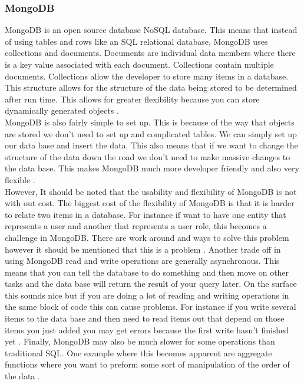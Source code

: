 \documentclass[onecolumn, draftclsnofoot,10pt, compsoc]{article}
\begin{document}
		\subsubsection{MongoDB}
		MongoDB is an open source database NoSQL database. This means that instead of using tables and rows like an SQL relational database, MongoDB uses collections and documents. Documents are individual data members where there is a key value associated with each document. Collections contain multiple documents. Collections allow the developer to store many items in a database. This structure allows for the structure of the data being stored to be determined after run time. This allows for greater flexibility because you can store dynamically generated objects \cite{IEEEexample:MongoDB}.\\
		MongoDB is also fairly simple to set up. This is because of the way that objects are stored we don't need to set up and complicated tables. We can simply set up our data base and insert the data. This also means that if we want to change the structure of the data down the road we don't need to make massive changes to the data base. This makes MongoDB much more developer friendly and also very flexible \cite{IEEEexample:MongoDBvsSQL}.\\
		However, It should be noted that the usability and flexibility of MongoDB is not with out cost. The biggest cost of the flexibility of MongoDB is that it is harder to relate two items in a database. For instance if want to have one entity that represents a user and another that represents a user role, this becomes a challenge in MongoDB. There are work around and ways to solve this problem however it should be mentioned that this is a problem \cite{IEEEexample:MongoDBProblems}. Another trade off in using MongoDB read and write operations are generally asynchronous. This means that you can tell the database to do something and then move on other tasks and the data base will return the result of your query later. On the surface this sounds nice but if you are doing a lot of reading and writing operations in the same block of code this can cause problems. For instance if you write several items to the data base and then need to read items out that depend on those items you just added you may get errors because the first write hasn't finished yet \cite{IEEEexample:ProblemsWithMongoDB}. Finally, MongoDB may also be much slower for some operations than traditional SQL. One example where this becomes apparent are aggregate functions where you want to preform some sort of manipulation of the order of the data \cite{IEEEexample:Benchmark}.\\
	
\end{document}
